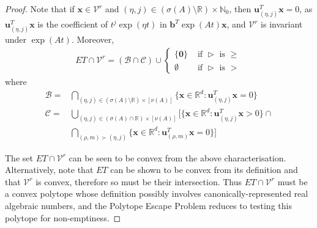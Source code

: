\begin{proof}
Note that if $\boldsymbol{x}\in\mathcal{V}^{r}$ and $(\eta,j)\in
(\sigma(A)\setminus \mathbb{R})\times \mathbb{N}_{0}$, then
$\boldsymbol{u}_{(\eta,j)}^{T}\boldsymbol{x}=0$, as
$\boldsymbol{u}_{(\eta,j)}^{T}\boldsymbol{x}$ is the coefficient of $t^{j} \exp(\eta
t)$ in $\boldsymbol{b}^{T}\exp(At) \boldsymbol{x}$, and $\mathcal{V}^{r}$ is
invariant under $\exp(At)$. Moreover,
%
\begin{align*}
\mathit{ET}\cap\mathcal{V}^{r}=(\mathcal{B}\cap\mathcal{C}) \cup
\begin{cases}
\lbrace \boldsymbol{0} \rbrace & \text{ if } \triangleright \text{ is } \geq \\
\emptyset & \text{ if } \triangleright \text{ is } >
\end{cases}
\end{align*}
where
\begin{align*}
\mathcal{B}=&\bigcap\limits_{(\eta,j)\in (\sigma(A)\setminus \mathbb{R})\times [\nu(A)]} \lbrace \boldsymbol{x}\in\mathbb{R}^{d}: \boldsymbol{u}_{(\eta,j)}^{T} \boldsymbol{x}=0 \rbrace \\
\mathcal{C}=&\bigcup\limits_{(\eta,j)\in(\sigma(A)\cap \mathbb{R})\times [\nu(A)]} \bigg[ \lbrace \boldsymbol{x}\in\mathbb{R}^{d}: \boldsymbol{u}_{(\eta,j)}^{T} \boldsymbol{x}>0 \rbrace \cap \\
&\bigcap\limits_{(\rho,m)\succ (\eta,j)} \lbrace \boldsymbol{x}\in\mathbb{R}^{d}: \boldsymbol{u}_{(\rho,m)}^{T} \boldsymbol{x}=0 \rbrace \bigg]
\end{align*}

The set $\mathit{ET}\cap\mathcal{V}^{r}$ can be seen to be convex from
the above characterisation. Alternatively, note that $\mathit{ET}$ can
be shown to be convex from its definition and that $\mathcal{V}^{r}$
is convex, therefore so must be their intersection. Thus
$\mathit{ET}\cap\mathcal{V}^{r}$ must be a convex polytope whose
definition possibly involves canonically-represented real algebraic
numbers, and the Polytope Escape Problem reduces to testing this
polytope for non-emptiness.
\end{proof}

